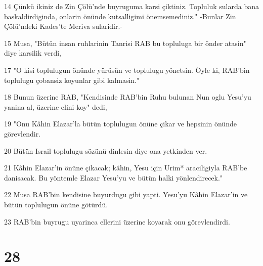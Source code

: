 \par 14 Çünkü ikiniz de Zin Çölü'nde buyruguma karsi çiktiniz. Topluluk sularda bana baskaldirdiginda, onlarin önünde kutsalligimi önemsemediniz." -Bunlar Zin Çölü'ndeki Kades'te Meriva sularidir.-
\par 15 Musa, "Bütün insan ruhlarinin Tanrisi RAB bu topluluga bir önder atasin" diye karsilik verdi,
\par 17 "O kisi toplulugun önünde yürüsün ve toplulugu yönetsin. Öyle ki, RAB'bin toplulugu çobansiz koyunlar gibi kalmasin."
\par 18 Bunun üzerine RAB, "Kendisinde RAB'bin Ruhu bulunan Nun oglu Yesu'yu yanina al, üzerine elini koy" dedi,
\par 19 "Onu Kâhin Elazar'la bütün toplulugun önüne çikar ve hepsinin önünde görevlendir.
\par 20 Bütün Israil toplulugu sözünü dinlesin diye ona yetkinden ver.
\par 21 Kâhin Elazar'in önüne çikacak; kâhin, Yesu için Urim* araciligiyla RAB'be danisacak. Bu yöntemle Elazar Yesu'yu ve bütün halki yönlendirecek."
\par 22 Musa RAB'bin kendisine buyurdugu gibi yapti. Yesu'yu Kâhin Elazar'in ve bütün toplulugun önüne götürdü.
\par 23 RAB'bin buyrugu uyarinca ellerini üzerine koyarak onu görevlendirdi.

\chapter{28}

